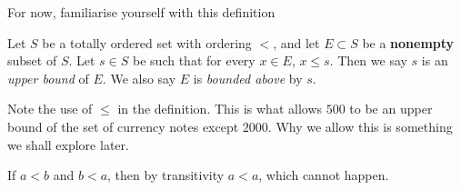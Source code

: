 For now, familiarise yourself with this definition
\begin{SNP}{\dfn}{Let $S$ be a totally ordered set with ordering $<$, and let $E \subset S$ be a \textbf{nonempty} subset of $S$. Let $s \in S$ be such that for every $x \in E$, $x \leq s$. Then we say $s$ is an \emph{upper bound} of $E$. We also say $E$ is \emph{bounded above} by $s$.}
\end{SNP}

Note the use of $\leq$ in the definition. This is what allows $500$ to be an upper bound of the set of currency notes except $2000$. Why we allow this is something we shall explore later.

\AnswerSection
\ans If $a < b$ and $b < a$, then by transitivity $a < a$, which cannot happen.

